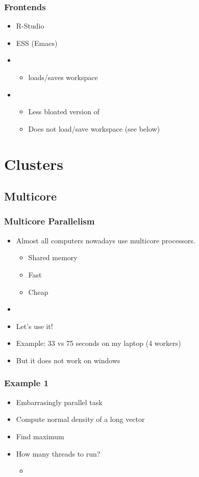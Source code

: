 \documentclass[pdftex]{beamer}
\begin{document}
\begin{frame}
  \frametitle{Frontends}
  \begin{itemize}
  \item R-Studio
  \item ESS (Emacs)
  \item {}
    \begin{itemize}
    \item loads/saves workspace
    \end{itemize}
  \item {}
    \begin{itemize}
    \item Less bloated version of 
    \item Does not load/save workspace (see below)
    \end{itemize}
  \end{itemize}
\end{frame}

\section{Clusters}
\subsection{Multicore}

\begin{frame}
  \frametitle{Multicore Parallelism}
  \begin{itemize}
  \item Almost all computers nowadays use multicore processors.
    \begin{itemize}
    \item Shared memory
    \item Fast
    \item Cheap
    \end{itemize}
  \item {}
  \item Let's use it!
  \item Example: 33 vs 75 seconds on my laptop (4 workers)
    \pause
  \item But it does not work on windows \frownie{}
  \end{itemize}
\end{frame}

\begin{frame}
  \frametitle{Example 1}
  \begin{itemize}
  \item Embarrasingly parallel task
  \item Compute normal density of a long vector
  \item Find maximum
  \item How many threads to run?
    \begin{itemize}
    \item {}
    \end{itemize}
  \end{itemize}
\end{frame}
\end{document}
